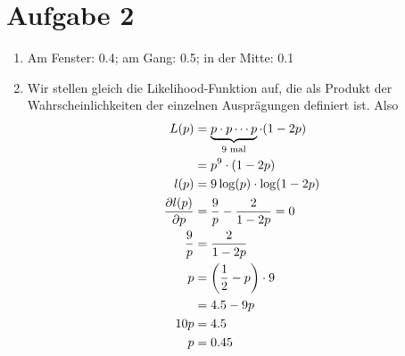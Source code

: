 \documentclass{article}
\begin{document}
	\section*{Aufgabe 2}
	\begin{enumerate}[label=(\alph*)]
		\item Am Fenster: 0.4; am Gang: 0.5; in der Mitte: 0.1
		\item Wir stellen gleich die Likelihood-Funktion auf, die als Produkt der Wahrscheinlichkeiten der einzelnen Ausprägungen definiert ist. Also
		\begin{align}
			L(p) &= \underbrace{p\cdot p\cdots p}_{9\text{ mal}} \cdot (1-2p) \notag \\
			&= p^9\cdot (1-2p) \notag \\
			l(p) &= 9\log(p) \cdot \log(1-2p) \notag \\
			\frac{\partial l(p)}{\partial p} &= \frac{9}{p} - \frac{2}{1-2p} =0 \notag \\
			\frac{9}{p} &= \frac{2}{1-2p} \notag \\
			p &= \left(\frac{1}{2}-p\right)\cdot 9 \notag \\
			&= 4.5-9p \notag \\
			10p &= 4.5 \notag \\
			p &= 0.45 \notag
		\end{align}
	\end{enumerate}
\end{document}
